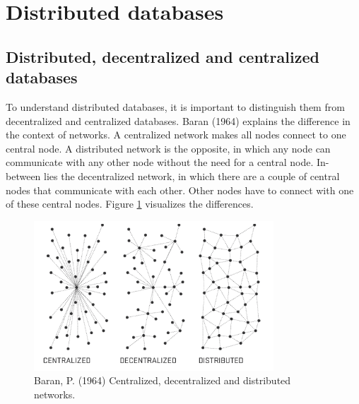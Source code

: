 \section{Distributed databases}
\label{sec:distributed-dbs}

\subsection{Distributed, decentralized and centralized databases}

To understand distributed databases, it is important to distinguish them from decentralized and centralized databases. Baran (1964) \cite{baran-distributed-communications} explains the difference in the context of networks. A centralized network makes all nodes connect to one central node. A distributed network is the opposite, in which any node can communicate with any other node without the need for a central node. In-between lies the decentralized network, in which there are a couple of central nodes that communicate with each other. Other nodes have to connect with one of these central nodes.
Figure \ref{fig:baran-networks} visualizes the differences.

\begin{figure}[h]
\centering
\includegraphics[width=0.8\textwidth]{paper-images/baran_networks.png}
\caption{Baran, P. (1964) Centralized, decentralized and distributed networks.} 
\label{fig:baran-networks}
\end{figure} 

